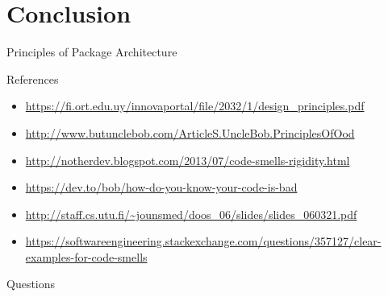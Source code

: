 \documentclass[xcolor=svgnames]{beamer}
\begin{document}

\section{Conclusion}


\begin{frame}{Principles of Package Architecture}
\end{frame}


\begin{frame}{References}
    \begin{itemize}
        \item \url{https://fi.ort.edu.uy/innovaportal/file/2032/1/design_principles.pdf}
        \item \url{http://www.butunclebob.com/ArticleS.UncleBob.PrinciplesOfOod}
        \item \url{http://notherdev.blogspot.com/2013/07/code-smells-rigidity.html}
        \item \url{https://dev.to/bob/how-do-you-know-your-code-is-bad}
        \item \url{http://staff.cs.utu.fi/~jounsmed/doos_06/slides/slides_060321.pdf}
        \item \url{https://softwareengineering.stackexchange.com/questions/357127/clear-examples-for-code-smells}
    \end{itemize}
\end{frame}


\begin{frame}{Questions}
\end{frame}

\fi
\end{document}
